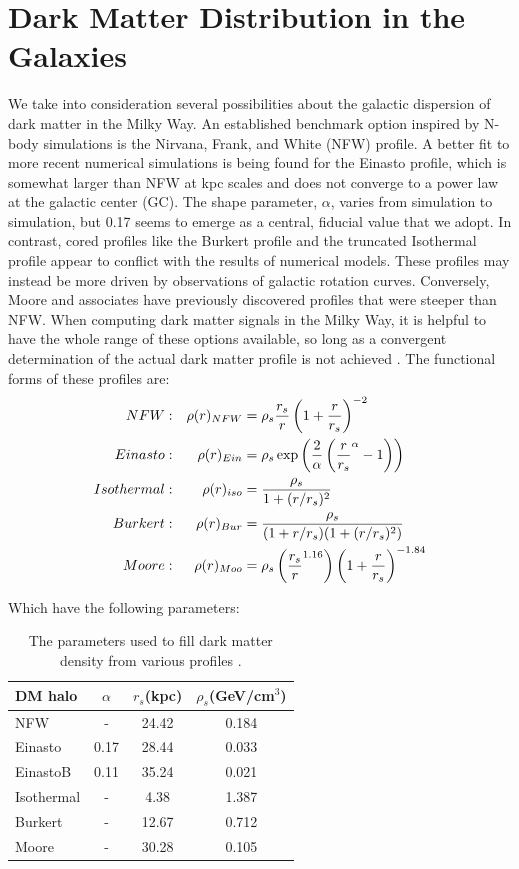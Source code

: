 \documentclass[10pt, oneside]{book}
\numberwithin{equation}{chapter}
\begin{document}
\section{Dark Matter Distribution in the Galaxies}
We take into consideration several possibilities about the galactic dispersion of dark matter in the Milky Way. An established benchmark option inspired by N-body simulations is the Nirvana, Frank, and White (NFW) profile. A better fit to more recent numerical simulations is being found for the Einasto profile, which is somewhat larger than NFW at kpc scales and does not converge to a power law at the galactic center (GC). The shape parameter, $\alpha$, varies from simulation to simulation, but 0.17 seems to emerge as a central, fiducial value that we adopt. In contrast, cored profiles like the Burkert profile and the truncated Isothermal profile appear to conflict with the results of numerical models. These profiles may instead be more driven by observations of galactic rotation curves. Conversely, Moore and associates have previously discovered profiles that were steeper than NFW. When computing dark matter signals in the Milky Way, it is helpful to have the whole range of these options available, so long as a convergent determination of the actual dark matter profile is not achieved \cite{Marco_Cirelli_2011}. The functional forms of these profiles are:
\begin{equation}
\begin{aligned}\label{dark matter density}
    NFW&:& \rho(r)_{NFW} &= \rho_s \frac{r_s}{r}\left(1+\frac{r}{r_s}\right)^{-2}\\
    Einasto&:& \rho(r)_{Ein} &= \rho_s\exp\left(\-\frac{2}{\alpha}\left(\frac{r}{r_s}^\alpha-1\right)\right)\\
    Isothermal&:& \rho(r)_{iso} &= \frac{\rho_s}{1+(r/r_s)^2}\\
    Burkert&:& \rho(r)_{Bur} &= \frac{\rho_s}{(1+r/r_s)(1+(r/r_s)^2)}\\
    Moore&:& \rho(r)_{Moo} &= \rho_s\left(\frac{r_s}{r}^{1.16}\right)\left(1+\frac{r}{r_s}\right)^{-1.84}
\end{aligned}
\end{equation}

Which have the following parameters:

\begin{table}[h]
    \centering
    \begin{tabular}{|l|c|c|c|}
    \hline
    DM halo  & $\alpha$ & $r_s$(kpc) & $\rho_s$(GeV/cm$^3$)\\
    \hline
    NFW & - & 24.42 & 0.184\\
    Einasto & 0.17 & 28.44 & 0.033\\
    EinastoB & 0.11 & 35.24 & 0.021\\
    Isothermal & - & 4.38 & 1.387\\
    Burkert & - & 12.67 & 0.712\\
    Moore & - & 30.28 & 0.105\\
    \hline
    \end{tabular}
    \caption{The parameters used to fill dark matter density from various profiles \cite{Marco_Cirelli_2011}.}
    \label{tab: paremeters}
\end{table}
\end{document}
